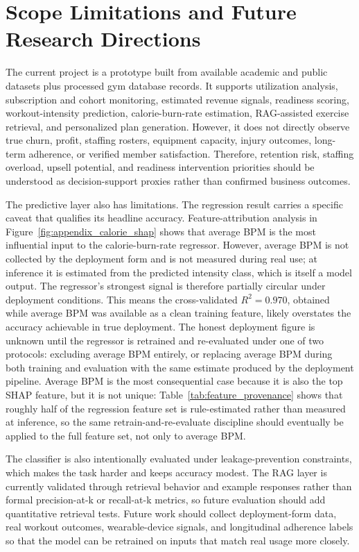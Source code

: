 \documentclass{aitthesis}
\begin{document}
\section{Scope Limitations and Future Research Directions}

The current project is a prototype built from available academic and public datasets plus processed gym database records. It supports utilization analysis, subscription and cohort monitoring, estimated revenue signals, readiness scoring, workout-intensity prediction, calorie-burn-rate estimation, RAG-assisted exercise retrieval, and personalized plan generation. However, it does not directly observe true churn, profit, staffing rosters, equipment capacity, injury outcomes, long-term adherence, or verified member satisfaction. Therefore, retention risk, staffing overload, upsell potential, and readiness intervention priorities should be understood as decision-support proxies rather than confirmed business outcomes.

The predictive layer also has limitations. The regression result carries a specific caveat that qualifies its headline accuracy. Feature-attribution analysis in Figure~\ref{fig:appendix_calorie_shap} shows that average BPM is the most influential input to the calorie-burn-rate regressor. However, average BPM is not collected by the deployment form and is not measured during real use; at inference it is estimated from the predicted intensity class, which is itself a model output. The regressor's strongest signal is therefore partially circular under deployment conditions. This means the cross-validated $R^2=0.970$, obtained while average BPM was available as a clean training feature, likely overstates the accuracy achievable in true deployment. The honest deployment figure is unknown until the regressor is retrained and re-evaluated under one of two protocols: excluding average BPM entirely, or replacing average BPM during both training and evaluation with the same estimate produced by the deployment pipeline. Average BPM is the most consequential case because it is also the top SHAP feature, but it is not unique: Table~\ref{tab:feature_provenance} shows that roughly half of the regression feature set is rule-estimated rather than measured at inference, so the same retrain-and-re-evaluate discipline should eventually be applied to the full feature set, not only to average BPM.

The classifier is also intentionally evaluated under leakage-prevention constraints, which makes the task harder and keeps accuracy modest. The RAG layer is currently validated through retrieval behavior and example responses rather than formal precision-at-k or recall-at-k metrics, so future evaluation should add quantitative retrieval tests. Future work should collect deployment-form data, real workout outcomes, wearable-device signals, and longitudinal adherence labels so that the model can be retrained on inputs that match real usage more closely.
\end{document}
